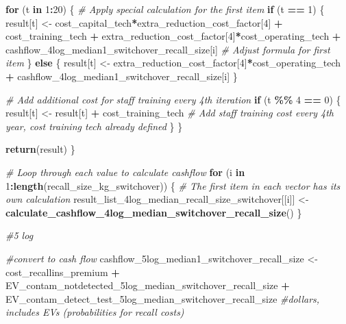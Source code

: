 \documentclass[
]{article}
\newenvironment{Shaded}{\begin{snugshade}}{\end{snugshade}}
\newcommand{\CommentTok}[1]{\textcolor[rgb]{0.56,0.35,0.01}{\textit{#1}}}
\newcommand{\ControlFlowTok}[1]{\textcolor[rgb]{0.13,0.29,0.53}{\textbf{#1}}}
\newcommand{\DecValTok}[1]{\textcolor[rgb]{0.00,0.00,0.81}{#1}}
\newcommand{\FunctionTok}[1]{\textcolor[rgb]{0.13,0.29,0.53}{\textbf{#1}}}
\newcommand{\NormalTok}[1]{#1}
\newcommand{\OtherTok}[1]{\textcolor[rgb]{0.56,0.35,0.01}{#1}}
\newcommand{\SpecialCharTok}[1]{\textcolor[rgb]{0.81,0.36,0.00}{\textbf{#1}}}
\begin{document}
\begin{Shaded}
\begin{Highlighting}[]
  \ControlFlowTok{for}\NormalTok{ (t }\ControlFlowTok{in} \DecValTok{1}\SpecialCharTok{:}\DecValTok{20}\NormalTok{) \{}
    \CommentTok{\# Apply special calculation for the first item}
    \ControlFlowTok{if}\NormalTok{ (t }\SpecialCharTok{==} \DecValTok{1}\NormalTok{) \{}
\NormalTok{      result[t] }\OtherTok{\textless{}{-}}\NormalTok{ cost\_capital\_tech}\SpecialCharTok{*}\NormalTok{extra\_reduction\_cost\_factor[}\DecValTok{4}\NormalTok{] }\SpecialCharTok{+}\NormalTok{ cost\_training\_tech }\SpecialCharTok{+}\NormalTok{ extra\_reduction\_cost\_factor[}\DecValTok{4}\NormalTok{]}\SpecialCharTok{*}\NormalTok{cost\_operating\_tech }\SpecialCharTok{+}\NormalTok{ cashflow\_4log\_median1\_switchover\_recall\_size[i] }\CommentTok{\# Adjust formula for first item}
\NormalTok{    \} }\ControlFlowTok{else}\NormalTok{ \{}
\NormalTok{      result[t] }\OtherTok{\textless{}{-}}\NormalTok{ extra\_reduction\_cost\_factor[}\DecValTok{4}\NormalTok{]}\SpecialCharTok{*}\NormalTok{cost\_operating\_tech }\SpecialCharTok{+}\NormalTok{ cashflow\_4log\_median1\_switchover\_recall\_size[i]}
\NormalTok{    \}}
    
    \CommentTok{\# Add additional cost for staff training every 4th iteration}
    \ControlFlowTok{if}\NormalTok{ (t }\SpecialCharTok{\%\%} \DecValTok{4} \SpecialCharTok{==} \DecValTok{0}\NormalTok{) \{}
\NormalTok{      result[t] }\OtherTok{\textless{}{-}}\NormalTok{ result[t] }\SpecialCharTok{+}\NormalTok{ cost\_training\_tech  }\CommentTok{\# Add staff training cost every 4th year, cost training tech already defined}
\NormalTok{    \}}
\NormalTok{  \}}
  
  \FunctionTok{return}\NormalTok{(result)}
\NormalTok{\}}

\CommentTok{\# Loop through each value to calculate cashflow}
\ControlFlowTok{for}\NormalTok{ (i }\ControlFlowTok{in} \DecValTok{1}\SpecialCharTok{:}\FunctionTok{length}\NormalTok{(recall\_size\_kg\_switchover)) \{}
  \CommentTok{\# The first item in each vector has its own calculation}
\NormalTok{  result\_list\_4log\_median\_recall\_size\_switchover[[i]] }\OtherTok{\textless{}{-}} \FunctionTok{calculate\_cashflow\_4log\_median\_switchover\_recall\_size}\NormalTok{()}
\NormalTok{\}}




\CommentTok{\#5 log }

\CommentTok{\#convert to cash flow}
\NormalTok{cashflow\_5log\_median1\_switchover\_recall\_size }\OtherTok{\textless{}{-}}\NormalTok{ cost\_recallins\_premium }\SpecialCharTok{+}\NormalTok{ EV\_contam\_notdetected\_5log\_median\_switchover\_recall\_size }\SpecialCharTok{+}\NormalTok{ EV\_contam\_detect\_test\_5log\_median\_switchover\_recall\_size }\CommentTok{\#dollars, includes EVs (probabilities for recall costs)}



\end{Highlighting}
\end{Shaded}
\end{document}
